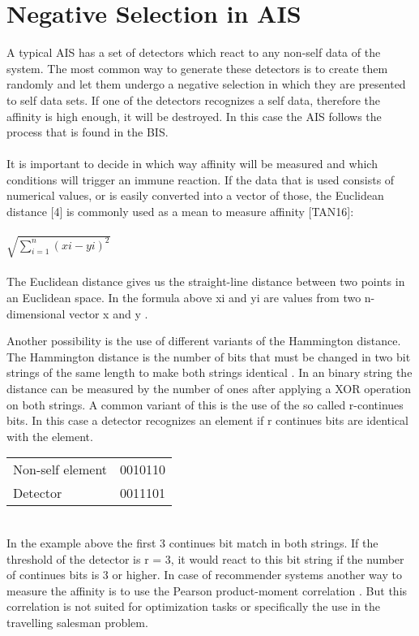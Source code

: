 \section{Negative Selection in AIS}

A typical AIS has a set of detectors which react to any non-self data of the system. The most common way to generate these detectors is to create them randomly and let them undergo a negative selection in which they are presented to self data sets. If one of the detectors recognizes a self data, therefore the affinity is high enough, it will be destroyed. In this case the AIS follows the process that is found in the BIS.\\\\ 
It is important to decide in which way affinity will be measured and which conditions will trigger an immune reaction. If the data that is used consists of numerical values, or is easily converted into a vector of those, the Euclidean distance [4] is commonly used as a mean to measure affinity [TAN16]:\\\\
\begin{math}
\sqrt{\sum_{i=1}^{n}(xi-yi)^2}
\end{math}\\\\
The Euclidean distance gives us the straight-line distance between two points in an Euclidean space. In the formula above xi and yi are values from two n-dimensional vector x and y \cite{howard}.  

Another possibility is the use of different variants of the Hammington distance. The Hammington distance is the number of bits that must be changed in two bit strings of the same length to make both strings identical \cite{hammington}. In an binary string the distance can be measured by the number of ones after applying a XOR operation on both strings. A common variant of this is the use of the so called r-continues bits. In this case a detector recognizes an element if r continues bits are identical with the element.\\
\begin{table*}[htbp]
	\begin{tabular}{ll}
Non-self element & 0010110\\
Detector & 0011101
	\end{tabular}
\end{table*}\\
In the example above the first 3 continues bit match in both strings. If the threshold of the detector is r = 3, it would react to this bit string if the number of continues bits is 3 or higher.
In case of recommender systems another way to measure the affinity is to use the Pearson product-moment correlation \cite{pearson}. But this correlation is not suited for optimization tasks or specifically the use in the travelling salesman problem. 
